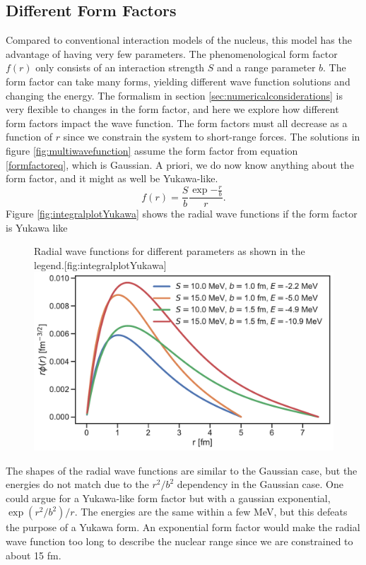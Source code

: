 \subsection{Different Form Factors}\label{sec:formfactors}
Compared to conventional interaction models of the nucleus, this model has the advantage of having very few parameters. The phenomenological form factor $f(r)$ only consists of an interaction strength $S$ and a range parameter $b$. The form factor can take many forms, yielding different wave function solutions and changing the energy. The formalism in section \ref{sec:numericalconsiderations} is very flexible to changes in the form factor, and here we explore how different form factors impact the wave function. The form factors must all decrease as a function of $r$ since we constrain the system to short-range forces. The solutions in figure \ref{fig:multiwavefunction} assume the form factor from equation \eqref{formfactoreq}, which is Gaussian. A priori, we do now know anything about the form factor, and it might as well be Yukawa-like.
\begin{equation}\label{YukawaForm}
	f(r) = \frac{S}{b}\frac{\exp{-\frac{r}{b}}}{r}.
\end{equation}
Figure \ref{fig:integralplotYukawa} shows the radial wave functions if the form factor is Yukawa like
\begin{figure}[H]
	\begin{sidecaption}{Radial wave functions for different parameters as shown in the legend.}[fig:integralplotYukawa]
		\includegraphics[width=\linewidth]{Figures/multiwavefunctionYukawa.pdf}
	\end{sidecaption}
\end{figure}
The shapes of the radial wave functions are similar to the Gaussian case, but the energies do not match due to the $r^2/b^2$ dependency in the Gaussian case. One could argue for a Yukawa-like form factor but with a gaussian exponential, $\exp(r^2/b^2)/r$. The energies are the same within a few MeV, but this defeats the purpose of a Yukawa form. An exponential form factor would make the radial wave function too long to describe the nuclear range since we are constrained to about 15 fm.  
